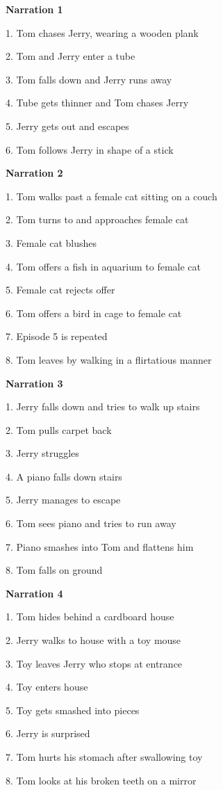 \documentclass[]{elsarticle} %
\begin{document}
\label{section:b}

\textbf{Narration 1}

1. Tom chases Jerry, wearing a wooden plank

2. Tom and Jerry enter a tube

3. Tom falls down and Jerry runs away

4. Tube gets thinner and Tom chases Jerry

5. Jerry gets out and escapes

6. Tom follows Jerry in shape of a stick

\textbf{Narration 2}

1. Tom walks past a female cat sitting on a couch

2. Tom turns to and approaches female cat

3. Female cat blushes

4. Tom offers a fish in aquarium to female cat

5. Female cat rejects offer

6. Tom offers a bird in cage to female cat

7. Episode 5 is repeated

8. Tom leaves by walking in a flirtatious manner

\textbf{Narration 3}

1. Jerry falls down and tries to walk up stairs

2. Tom pulls carpet back

3. Jerry struggles

4. A piano falls down stairs

5. Jerry manages to escape

6. Tom sees piano and tries to run away

7. Piano smashes into Tom and flattens him

8. Tom falls on ground

\textbf{Narration 4}

1. Tom hides behind a cardboard house

2. Jerry walks to house with a toy mouse

3. Toy leaves Jerry who stops at entrance

4. Toy enters house

5. Toy gets smashed into pieces

6. Jerry is surprised

7. Tom hurts his stomach after swallowing toy

8. Tom looks at his broken teeth on a mirror
\end{document}
